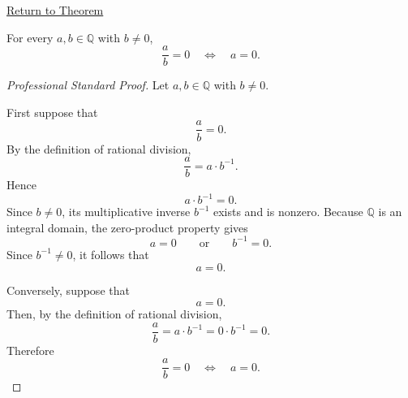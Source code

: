 \newpage
{}
\label{prf:rational-quotient-zero-iff-numerator-zero}

\begin{remark*}[Return]
\hyperref[thm:rational-quotient-zero-iff-numerator-zero]{Return to Theorem}
\end{remark*}

\begin{theorem*}
For every $a,b\in\mathbb{Q}$ with $b\neq 0$,
\[
\frac{a}{b}=0
\quad\Longleftrightarrow\quad
a=0.
\]
\end{theorem*}

\begin{proof}[Professional Standard Proof]
\LRAProofBodyStart
Let $a,b\in\mathbb{Q}$ with $b\neq 0$.

First suppose that
\[
\frac{a}{b}=0.
\]
By the definition of rational division,
\[
\frac{a}{b}=a\cdot b^{-1}.
\]
Hence
\[
a\cdot b^{-1}=0.
\]
Since $b\neq 0$, its multiplicative inverse $b^{-1}$ exists and is nonzero.
Because $\mathbb{Q}$ is an integral domain, the zero-product property gives
\[
a=0
\qquad\text{or}\qquad
b^{-1}=0.
\]
Since $b^{-1}\neq 0$, it follows that
\[
a=0.
\]

Conversely, suppose that
\[
a=0.
\]
Then, by the definition of rational division,
\[
\frac{a}{b}=a\cdot b^{-1}=0\cdot b^{-1}=0.
\]
Therefore
\[
\frac{a}{b}=0
\quad\Longleftrightarrow\quad
a=0.
\]
\end{proof}


